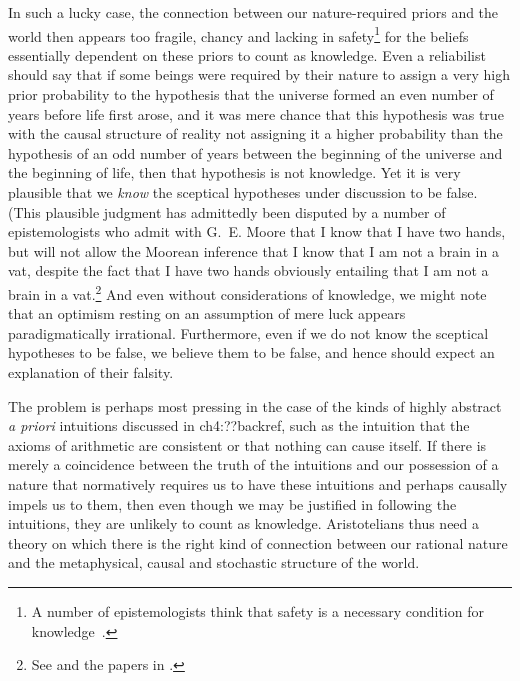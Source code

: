 In such a lucky case, the connection between our nature-required priors and the world then appears too fragile, chancy and lacking in safety\footnote{A number of epistemologists think that safety is a necessary condition for 
knowledge~\parencite{SosaSafety,WilliamsonKn,PritchardLuck}.}
for the beliefs essentially dependent on these priors to count as knowledge. Even a reliabilist should say that if some beings
were required by their nature to assign a very high prior probability to the hypothesis that the universe formed an even number 
of years before life first arose, and it was mere chance that this hypothesis was true with the causal structure of reality
not assigning it a higher probability than the hypothesis of an odd number of years between the beginning of the universe and
the beginning of life, then that hypothesis is not knowledge. Yet it is very plausible that we \textit{know} the sceptical hypotheses
under discussion to be false. (This plausible judgment has admittedly been disputed by a number of epistemologists who admit with G.~E. Moore that
I know that I have two hands, but will not allow the Moorean inference that I know that I am not a brain in a vat, despite the fact that I have two hands
obviously entailing that I am not a brain in a vat.\footnote{See  and the papers in
.} And even without considerations of knowledge, we might note that an optimism
resting on an assumption of mere luck appears paradigmatically irrational. Furthermore, even if we do not know the
sceptical hypotheses to be false, we believe them to be false, and hence should expect an explanation of their falsity.

The problem is perhaps most pressing in the case of the kinds of highly abstract \textit{a priori} intuitions discussed in ch4:??backref,
such as the intuition that the axioms of arithmetic are consistent or that nothing can cause itself. If there is merely a coincidence
between the truth of the intuitions and our possession of  a nature that normatively requires us to have these intuitions and perhaps causally 
impels us to them, then even though we may be justified in following the intuitions, they are unlikely to count as knowledge.
Aristotelians thus need a theory on which there is the right kind of connection between our rational nature and the metaphysical, causal and 
stochastic structure of the world. 


